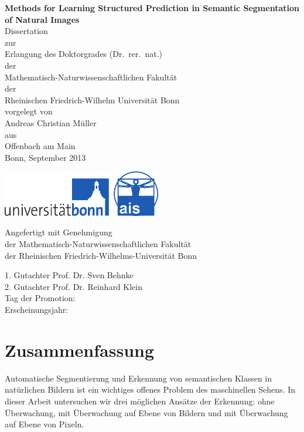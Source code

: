\documentclass[12pt,toc=bibnumbered, a4paper,twoside,DIV=11,BCOR=1cm]{scrbook}
\begin{document}
%
\begin{spacing}{1.5}
\begin{titlepage}
\vspace*{1mm}
\begin{center}
\Large\sffamily
\textbf{{\huge Methods for Learning Structured Prediction in Semantic Segmentation of Natural Images}}\\[5mm]
Dissertation\\
zur\\
Erlangung des Doktorgrades (Dr.\ rer.\ nat.)\\
der\\
Mathematisch-Naturwissenschaftlichen Fakult\"at\\
der\\
Rheinischen Friedrich-Wilhelm Universit\"at Bonn\\
vorgelegt von\\
{\LARGE Andreas Christian M\"uller}\\
aus\\
Offenbach am Main\\
Bonn, September 2013\\[10mm]

\end{center}
\hspace{3.4cm}\includegraphics[height=2.0cm]{ais_uni_logo}
\end{titlepage}
%
\clearpage
{}
\setcounter{page}{2}
\vspace*{5cm}
\Large\sffamily
\begin{center}
Angefertigt mit Genehmigung\\
der Mathematisch-Naturwissenschaftlichen Fakult\"at\\
der Rheinischen Friedrich-Wilhelms-Universit\"at Bonn\\
\end{center}
1. Gutachter Prof. Dr. Sven Behnke\\
2. Gutachter Prof. Dr. Reinhard Klein\\
Tag der Promotion:\\
Erscheinungsjahr:\\
\end{spacing}
\tableofcontents
\chapter*{Zusammenfassung}
\enlargethispage{10mm}
Automatische Segmentierung und Erkennung von semantischen Klassen in
nat\"urlichen Bildern ist ein wichtiges offenes Problem des maschinellen Sehens.
In dieser Arbeit untersuchen wir drei m\"oglichen Ans\"atze der Erkennung:
ohne \"Uberwachung, mit \"Uberwachung auf Ebene von Bildern und mit \"Uberwachung auf Ebene
von Pixeln.
\end{document}
